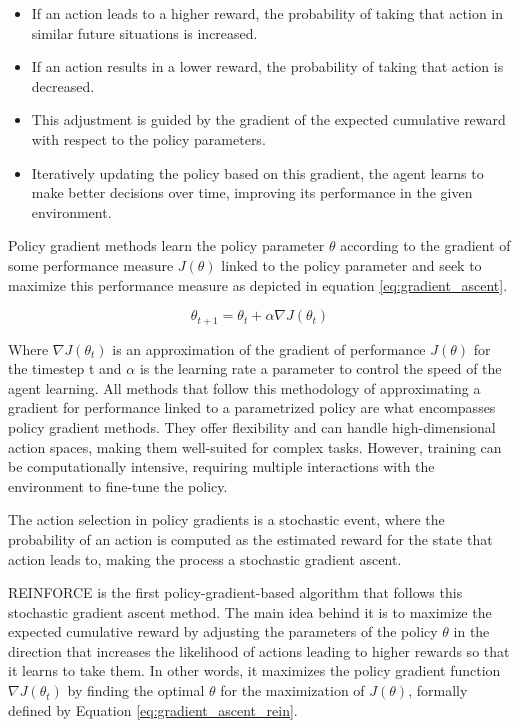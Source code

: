 \begin{itemize}
    \item If an action leads to a higher reward, the probability of taking that action in similar future situations is increased.
    \item If an action results in a lower reward, the probability of taking that action is decreased.
    \item This adjustment is guided by the gradient of the expected cumulative reward with respect to the policy parameters.
    \item Iteratively updating the policy based on this gradient, the agent learns to make better decisions over time, improving its performance in the given environment.
\end{itemize}

Policy gradient methods learn the policy parameter $\theta$ according to the gradient of some performance measure $J(\theta)$ linked to the policy parameter and seek to maximize this performance measure as depicted in equation \ref{eq:gradient_ascent}.

\begin{equation}
    \label{eq:gradient_ascent}
    \theta_{t+1} = \theta_t + \alpha \nabla J (\theta_t)
\end{equation}

Where $\nabla J (\theta_t)$ is an approximation of the gradient of performance $J(\theta)$ for the timestep t and $\alpha$ is the learning rate a parameter to control the speed of the agent learning. All methods that follow this methodology of approximating a gradient for performance linked to a parametrized policy are what encompasses policy gradient methods. They offer flexibility and can handle high-dimensional action spaces, making them well-suited for complex tasks. However, training can be computationally intensive, requiring multiple interactions with the environment to fine-tune the policy.

The action selection in policy gradients is a stochastic event, where the probability of an action is computed as the estimated reward for the state that action leads to, making the process a stochastic gradient ascent.

REINFORCE \cite{sutton1999policy} is the first policy-gradient-based algorithm that follows this stochastic gradient ascent method. The main idea behind it is to maximize the expected cumulative reward by adjusting the parameters of the policy $\theta$ in the direction that increases the likelihood of actions leading to higher rewards so that it learns to take them. In other words, it maximizes the policy gradient function $\nabla J (\theta_t)$ by finding the optimal $\theta$ for the maximization of $J(\theta)$, formally defined by Equation \ref{eq:gradient_ascent_rein}.


